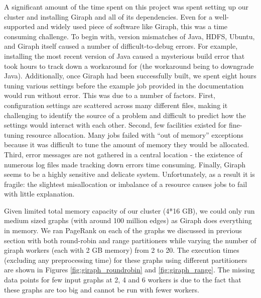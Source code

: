 A significant amount of the time spent on this project was spent setting up our cluster and installing 
Giraph and all of its dependencies. Even for a well-supported and widely used piece of software like 
Giraph, this was a time consuming challenge. To begin with, version mismatches of Java, HDFS, Ubuntu, 
and Giraph itself caused a number of difficult-to-debug errors. For example, installing the most recent 
version of Java caused a mysterious build error that took hours to track down a workaround for (the workaround 
being to downgrade Java). Additionally, once Giraph had been successfully built, we spent eight 
hours tuning various settings before the example job provided in the documentation would run without error. 
This was due to a number of factors. First, configuration settings are scattered across many different files, 
making it challenging to identify the source of a problem and difficult to predict how the settings would interact 
with each other. Second, few facilities existed for fine-tuning resource allocation. Many jobs failed with 
``out of memory'' exceptions because it was difficult to tune the amount of memory they would be 
allocated. Third, error messages are not gathered in a central location - the existence of numerous log files made 
tracking down errors time consuming. Finally, Giraph seems to be a highly sensitive and delicate system. 
Unfortunately, as a result it is fragile: the slightest misallocation or imbalance of a resource causes jobs to 
fail with little explanation.

Given limited total memory capacity of our cluster (4*16 GB), we could only run medium sized graphs 
(with around 100 million edges) as Giraph does everything in memory. We ran PageRank on each of the graphs 
we discussed in previous section with both round-robin and range partitioners while varying the number of 
giraph workers (each with 2 GB memory) from 2 to 20. The execution times (excluding any preprocessing time) 
for these graphs using different partitioners are shown in Figures 
\ref{fig:giraph_roundrobin} and 
\ref{fig:giraph_range}. The missing data points for few input graphs at 2, 4 and 6 workers is due to the fact 
that these graphs are too big and cannot be run with fewer workers. 


